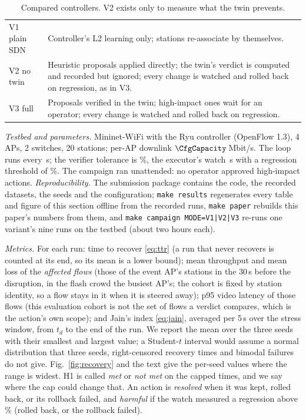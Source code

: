 \documentclass[conference]{IEEEtran}
\begin{document}
\begin{table}[t]
\caption{Compared controllers. V2 exists only to measure what the twin prevents.}
\label{tab:variants}
\centering\small
\begin{tabular}{@{}lp{6.2cm}@{}}
\toprule
V1 plain SDN & Controller's L2 learning only; stations re-associate by themselves.\\
V2 no twin & Heuristic proposals applied directly; the twin's verdict is computed and recorded but ignored; every change is watched and rolled back on regression, as in V3.\\
V3 full & Proposals verified in the twin; high-impact ones wait for an operator; every change is watched and rolled back on regression.\\
\bottomrule
\end{tabular}
\end{table}

\emph{Testbed and parameters.} Mininet-WiFi with the Ryu controller (OpenFlow 1.3), 4 APs, 2 switches, 20 stations; per-AP downlink $\CfgCapacity$\,Mbit/s. The loop runs every \CfgPeriod\,s; the verifier tolerance is \CfgChangePct\%, the executor's watch \CfgWatch\,s with a regression threshold of \CfgRegressPct\%. The campaign ran unattended: no operator approved high-impact actions. \emph{Reproducibility.} The submission package contains the code, the recorded datasets, the seeds and the configuration; \texttt{make results} regenerates every table and figure of this section offline from the recorded runs, \texttt{make paper} rebuilds this paper's numbers from them, and \texttt{make campaign MODE=V1|V2|V3} re-runs one variant's nine runs on the testbed (about two hours each).

\emph{Metrics.} For each run: time to recover \eqref{eq:ttr} (a run that never recovers is counted at its end, so its mean is a lower bound); mean throughput and mean loss of the \emph{affected flows} (those of the event AP's stations in the 30\,s before the disruption, in the flash crowd the busiest AP's; the cohort is fixed by station identity, so a flow stays in it when it is steered away); p95 video latency of those flows (this evaluation cohort is not the set of flows a verdict compares, which is the action's own scope); and Jain's index \eqref{eq:jain}, averaged per 5\,s over the stress window, from $t_d$ to the end of the run. We report the mean over the three seeds with their smallest and largest value; a Student-$t$ interval would assume a normal distribution that three seeds, right-censored recovery times and bimodal failures do not give. Fig.~\ref{fig:recovery} and the text give the per-seed values where the range is widest. H1 is called \emph{met} or \emph{not met} on the capped times, and we say where the cap could change that. An action is \emph{resolved} when it was kept, rolled back, or its rollback failed, and \emph{harmful} if the watch measured a regression above \CfgRegressPct\% (rolled back, or the rollback failed).
\end{document}
